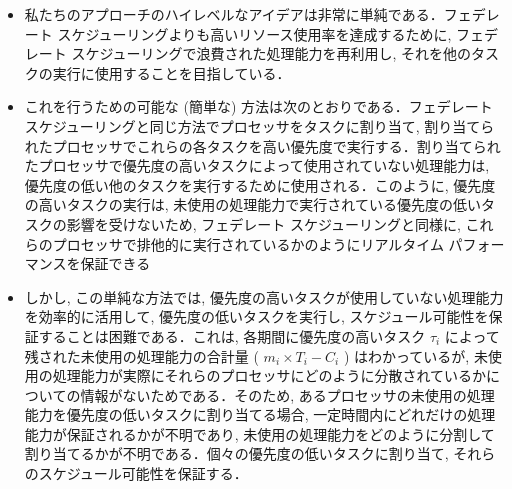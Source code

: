 \begin{frame}{}
    \begin{itemize}
        \item 私たちのアプローチのハイレベルなアイデアは非常に単純である．フェデレート スケジューリングよりも高いリソース使用率を達成するために, フェデレート スケジューリングで浪費された処理能力を再利用し, それを他のタスクの実行に使用することを目指している．
    \end{itemize}
\end{frame}

\begin{frame}{}
    \begin{itemize}
        \item これを行うための可能な (簡単な) 方法は次のとおりである．フェデレート スケジューリングと同じ方法でプロセッサをタスクに割り当て, 割り当てられたプロセッサでこれらの各タスクを高い優先度で実行する．割り当てられたプロセッサで優先度の高いタスクによって使用されていない処理能力は, 優先度の低い他のタスクを実行するために使用される．このように, 優先度の高いタスクの実行は, 未使用の処理能力で実行されている優先度の低いタスクの影響を受けないため, フェデレート スケジューリングと同様に, これらのプロセッサで排他的に実行されているかのようにリアルタイム パフォーマンスを保証できる
    \end{itemize}
\end{frame}

\begin{frame}{}
    \begin{itemize}
        \item しかし, この単純な方法では, 優先度の高いタスクが使用していない処理能力を効率的に活用して, 優先度の低いタスクを実行し, スケジュール可能性を保証することは困難である．これは, 各期間に優先度の高いタスク $\tau_{i}$ によって残された未使用の処理能力の合計量 ( $m_{i} \times T_{i}-C_{i}$ ) はわかっているが, 未使用の処理能力が実際にそれらのプロセッサにどのように分散されているかについての情報がないためである．そのため, あるプロセッサの未使用の処理能力を優先度の低いタスクに割り当てる場合, 一定時間内にどれだけの処理能力が保証されるかが不明であり, 未使用の処理能力をどのように分割して割り当てるかが不明である．個々の優先度の低いタスクに割り当て, それらのスケジュール可能性を保証する．
    \end{itemize}
\end{frame}

